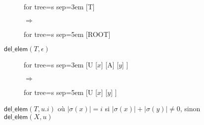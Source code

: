 \begin{figure}[htb]
	\centering
	\begin{subfigure}[c]{0.4\textwidth}
		\centering
		\begin{adjustbox}{valign=c, max width=\textwidth}
			\begin{forest}
			for tree={s sep=3em}
			[T]
			\end{forest}
		\end{adjustbox}
		\caption*{}
	\end{subfigure}
	\begin{subfigure}[c]{0.1\textwidth}
		\centering
		\huge{$\Rightarrow$}
	\end{subfigure}
	\begin{subfigure}[c]{0.4\textwidth}
		\centering
		\begin{adjustbox}{valign=c, max width=\textwidth}
			\begin{forest}
			for tree={s sep=5em}
			[ROOT]
			\end{forest}
		\end{adjustbox}
		\caption*{}
	\end{subfigure}
	\caption{$\textsf{del\_elem}(T, \epsilon)$}
	\label{fig:sch:op:insElem}
\end{figure}

\begin{figure}[htb]
	\centering
	\begin{subfigure}[c]{0.4\textwidth}
		\centering
		\begin{adjustbox}{valign=c, max width=\textwidth}
			\begin{forest}
			for tree={s sep=3em}
			[U
				[$x$]
				[A]
				[$y$]
			]
			\end{forest}
		\end{adjustbox}
		\caption*{}
	\end{subfigure}
	\begin{subfigure}[c]{0.1\textwidth}
		\centering
		\huge{$\Rightarrow$}
	\end{subfigure}
	\begin{subfigure}[c]{0.4\textwidth}
		\centering
		\begin{adjustbox}{valign=c, max width=\textwidth}
			\begin{forest}
			for tree={s sep=5em}
			[U
				[$x$]
				[$y$]
			]
			\end{forest}
		\end{adjustbox}
		\caption*{}
	\end{subfigure}
	\caption{$\textsf{del\_elem}(T, u.i)$ où $|\sigma(x)| = i$ si $|\sigma(x)| + |\sigma(y)| \neq 0$, sinon $\textsf{del\_elem}(X, u)$}
	\label{fig:sch:op:insElem}
\end{figure}

